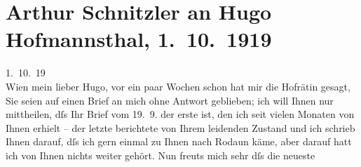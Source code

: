 

         
         \renewcommand{\erwaehntePersonen}{Personen: Richard Beer-Hofmann, Hugo von Hofmannsthal, Max Reinhardt, Olga Schnitzler, Elisabeth Steinrück, Richard Strauss, Berta Zuckerkandl}
         \renewcommand{\erwaehnteOrte}{Orte: Altaussee, Bad Aussee, Bösendorferstraße, München, Partenkirchen, Reichenau an der Rax, Rodaun, Seidlgasse, Wien}
         \renewcommand{\erwaehnteWerke}{Werke: Das Märchen. Schauspiel in drei Aufzügen, Der Gang zum Weiher. Dramatische Dichtung, Die Frau ohne Schatten. Erzählung, Die Frau ohne Schatten. Oper in drei Akten, Die Schwestern oder Casanova in Spa. Lustspiel in Versen, Gestern. Dramatische Studie in einem Akt in Versen}
               \section[Arthur Schnitzler an Hugo Hofmannsthal, 1. 10. 1919]{ Arthur Schnitzler an Hugo Hofmannsthal, 1. 10. 1919}\nopagebreak{}\rehead{ }\begin{ledgroupsized}[t]{13cm}\normalsize\beginnumbering \toendnotes[C]{\smallbreak\pagebreak[2]} 
\toendnotes[C]{\smallbreak}\pstart
           \raggedleft{}{\pb}1. 10. 19{\\}Wien\pend
           \pstart
           mein lieber Hugo, vor ein paar Wochen schon hat mir die Hofrätin gesagt, Sie seien auf einen Brief an mich
               ohne Antwort geblieben; ich will Ihnen nur mittheilen, dſs Ihr Brief vom
                  19. 9. der erste ist, den ich seit vielen Monaten von Ihnen erhielt –
               der letzte berichtete von Ihrem leidenden Zustand und ich schrieb Ihnen darauf, dſs
               ich gern einmal zu Ihnen nach Rodaun käme, aber
               darauf hatt ich von Ihnen nichts weiter gehört. Nun freuts mich sehr dſs die neueste

\end{ledgroupsized}
